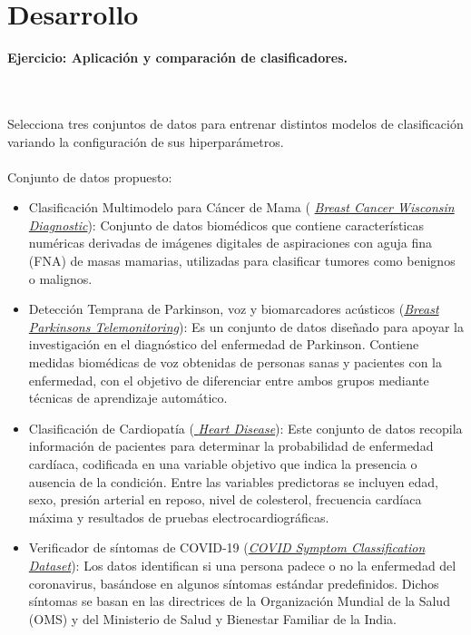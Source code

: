 \documentclass{article}
\begin{document}
\section{Desarrollo}
\begin{large}
\textbf{Ejercicio: Aplicación y comparación de clasificadores.}
\end{large}
\\\\
Selecciona tres conjuntos de datos para entrenar distintos modelos de clasificación variando la configuración de sus hiperparámetros.
\\\\
 Conjunto de datos propuesto:
\begin{itemize}
    \item Clasificación Multimodelo para Cáncer de Mama ( \href{https://archive.ics.uci.edu/dataset/17/breast+cancer+wisconsin+diagnostic}{\textit{Breast Cancer Wisconsin Diagnostic}}): Conjunto de datos biomédicos que contiene características numéricas derivadas de imágenes digitales de aspiraciones con aguja fina (FNA) de masas mamarias, utilizadas para clasificar tumores como benignos o malignos.
    \item Detección Temprana de Parkinson, voz y biomarcadores acústicos (\href{https://archive.ics.uci.edu/dataset/189/parkinsons+telemonitoring}{\textit{Breast Parkinsons Telemonitoring}}): Es un conjunto de datos diseñado para apoyar la investigación en el diagnóstico del enfermedad de Parkinson. Contiene medidas biomédicas de voz obtenidas de personas sanas y pacientes con la enfermedad, con el objetivo de diferenciar entre ambos grupos mediante técnicas de aprendizaje automático.
    \item Clasificación de Cardiopatía (\href{https://archive.ics.uci.edu/dataset/45/heart+disease}{ \textit{Heart Disease}}): Este conjunto de datos recopila información de pacientes para determinar la probabilidad de enfermedad cardíaca, codificada en una variable objetivo que indica la presencia o ausencia de la condición. Entre las variables predictoras se incluyen edad, sexo, presión arterial en reposo, nivel de colesterol, frecuencia cardíaca máxima y resultados de pruebas electrocardiográficas.
    \item Verificador de síntomas de COVID-19 (\href{https://www.kaggle.com/datasets/iamhungundji/covid19-symptoms-checker}{\textit{COVID Symptom Classification Dataset}}): Los datos identifican si una persona padece o no la enfermedad del coronavirus, basándose en algunos síntomas estándar predefinidos. Dichos síntomas se basan en las directrices de la Organización Mundial de la Salud (OMS) y del Ministerio de Salud y Bienestar Familiar de la India.    
\end{itemize} 
\end{document}
